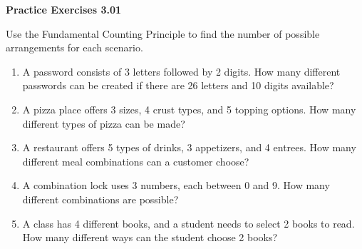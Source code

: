 \vspace{0.3ex}
\noindent\textbf{Practice Exercises 3.01}

\vspace{0.2ex}

Use the Fundamental Counting Principle to find the number of possible arrangements for each scenario.

\begin{enumerate}[label=\color{blue}\arabic*.]
    \item A password consists of 3 letters followed by 2 digits. How many different passwords can be created if there are 26 letters and 10 digits available?
    \item A pizza place offers 3 sizes, 4 crust types, and 5 topping options. How many different types of pizza can be made?
    \item A restaurant offers 5 types of drinks, 3 appetizers, and 4 entrees. How many different meal combinations can a customer choose?
    \item A combination lock uses 3 numbers, each between 0 and 9. How many different combinations are possible?
    \item A class has 4 different books, and a student needs to select 2 books to read. How many different ways can the student choose 2 books?
\end{enumerate}
